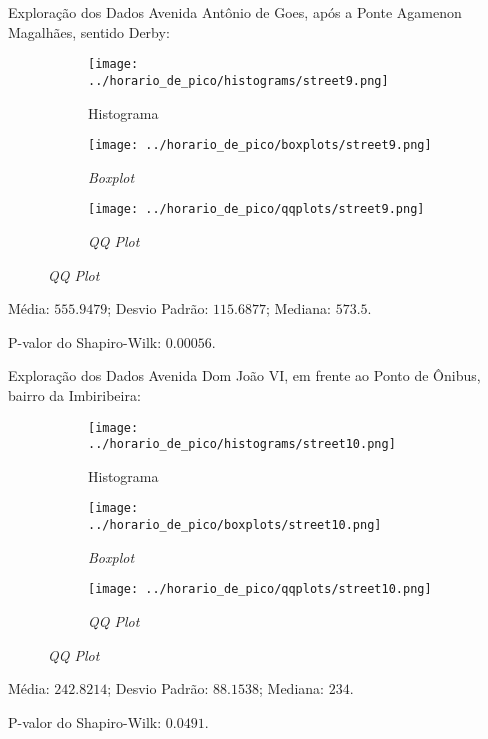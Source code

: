 \begin{frame}{Exploração dos Dados}
Avenida Antônio de Goes, após a Ponte Agamenon Magalhães, sentido Derby:
\begin{figure}
	\centering
	\begin{subfigure}{.33\textwidth}
		\centering
		\texttt{[image: ../horario\_de\_pico/histograms/street9.png]}
		\caption*{Histograma}
	\end{subfigure}%
	\begin{subfigure}{.33\textwidth}
		\centering
		\texttt{[image: ../horario\_de\_pico/boxplots/street9.png]}
		\caption*{\textit{Boxplot}}
	\end{subfigure}
	\begin{subfigure}{.32\textwidth}
		\centering
		\texttt{[image: ../horario\_de\_pico/qqplots/street9.png]}
		\caption*{\textit{QQ Plot}}
	\end{subfigure}
\end{figure}
Média: $555.9479$; Desvio Padrão: $115.6877$; Mediana: $573.5$.

P-valor do Shapiro-Wilk: $0.00056$.
\end{frame}

\begin{frame}{Exploração dos Dados}
Avenida Dom João VI, em frente ao Ponto de Ônibus, bairro da Imbiribeira:
\begin{figure}
	\centering
	\begin{subfigure}{.33\textwidth}
		\centering
		\texttt{[image: ../horario\_de\_pico/histograms/street10.png]}
		\caption*{Histograma}
	\end{subfigure}%
	\begin{subfigure}{.33\textwidth}
		\centering
		\texttt{[image: ../horario\_de\_pico/boxplots/street10.png]}
		\caption*{\textit{Boxplot}}
	\end{subfigure}
	\begin{subfigure}{.32\textwidth}
		\centering
		\texttt{[image: ../horario\_de\_pico/qqplots/street10.png]}
		\caption*{\textit{QQ Plot}}
	\end{subfigure}
\end{figure}
Média: $242.8214$; Desvio Padrão: $88.1538$; Mediana: $234$.

P-valor do Shapiro-Wilk: $0.0491$.
\end{frame}

